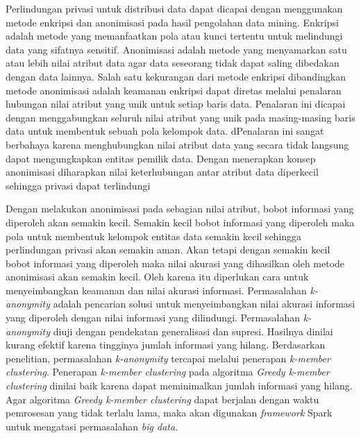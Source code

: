 \documentclass[a4paper,twoside]{article}
\begin{document}
Perlindungan privasi untuk distribusi data dapat dicapai dengan menggunakan metode enkripsi dan anonimisasi pada hasil pengolahan data mining. Enkripsi adalah metode yang memanfaatkan pola atau kunci tertentu untuk melindungi data yang sifatnya sensitif. Anonimisasi adalah metode yang menyamarkan satu atau lebih nilai atribut data agar data seseorang tidak dapat saling dibedakan dengan data lainnya. Salah satu kekurangan dari metode enkripsi dibandingkan metode anonimisasi adalah keamanan enkripsi dapat diretas melalui penalaran hubungan nilai atribut yang unik untuk setiap baris data. Penalaran ini dicapai dengan menggabungkan seluruh nilai atribut yang unik pada masing-masing baris data untuk membentuk sebuah pola kelompok data. dPenalaran ini sangat berbahaya karena menghubungkan nilai atribut data yang secara tidak langsung dapat mengungkapkan entitas pemilik data. Dengan menerapkan konsep  anonimisasi diharapkan nilai keterhubungan antar atribut data diperkecil sehingga privasi dapat terlindungi

Dengan melakukan anonimisasi pada sebagian nilai atribut, bobot informasi yang diperoleh akan semakin kecil. Semakin kecil bobot informasi yang diperoleh maka pola untuk membentuk kelompok entitas data semakin kecil sehingga perlindungan privasi akan semakin aman. Akan tetapi dengan semakin kecil bobot informasi yang diperoleh maka nilai akurasi yang dihasilkan oleh metode anonimisasi akan semakin kecil. Oleh karena itu diperlukan cara untuk menyeimbangkan keamanan dan nilai akurasi informasi. Permasalahan {\it k-anonymity} adalah pencarian solusi untuk menyeimbangkan nilai akurasi informasi yang diperoleh dengan nilai informasi yang dilindungi. Permasalahan {\it k-anonymity} diuji dengan pendekatan generalisasi dan supresi. Hasilnya dinilai kurang efektif karena tingginya jumlah informasi yang hilang. Berdasarkan penelitian, permasalahan {\it k-anonymity} tercapai melalui penerapan {\it k-member clustering}. Penerapan {\it k-member clustering} pada algoritma {\it Greedy k-member clustering} dinilai baik karena dapat meminimalkan jumlah informasi yang hilang. Agar algoritma \textit{Greedy k-member clustering} dapat berjalan dengan waktu pemrosesan yang tidak terlalu lama, maka akan digunakan \textit{framework} Spark untuk mengatasi permasalahan \textit{big data}.
\end{document}
